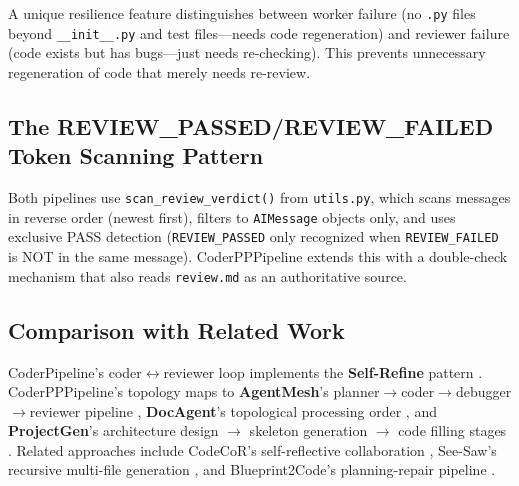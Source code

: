 A unique resilience feature distinguishes between worker failure (no \texttt{.py} files beyond \texttt{\_\_init\_\_.py} and test files---needs code regeneration) and reviewer failure (code exists but has bugs---just needs re-checking). This prevents unnecessary regeneration of code that merely needs re-review.

\subsection{The REVIEW\_PASSED/REVIEW\_FAILED Token Scanning Pattern}

Both pipelines use \texttt{scan\_review\_verdict()} from \texttt{utils.py}, which scans messages in reverse order (newest first), filters to \texttt{AIMessage} objects only, and uses exclusive PASS detection (\texttt{REVIEW\_PASSED} only recognized when \texttt{REVIEW\_FAILED} is NOT in the same message). CoderPPPipeline extends this with a double-check mechanism that also reads \texttt{review.md} as an authoritative source.

\subsection{Comparison with Related Work}

\raggedright
CoderPipeline's coder$\leftrightarrow$reviewer loop implements the \textbf{Self-Refine} pattern \cite{selfrefine}. CoderPPPipeline's topology maps to \textbf{AgentMesh}'s planner$\rightarrow$coder$\rightarrow$debugger$\rightarrow$reviewer pipeline \cite{agentmesh}, \textbf{DocAgent}'s topological processing order \cite{docagent}, and \textbf{ProjectGen}'s architecture design $\rightarrow$ skeleton generation $\rightarrow$ code filling stages \cite{projectgen}. Related approaches include CodeCoR's self-reflective collaboration \cite{codecor}, See-Saw's recursive multi-file generation \cite{seesaw}, and Blueprint2Code's planning-repair pipeline \cite{blueprint2code}.
